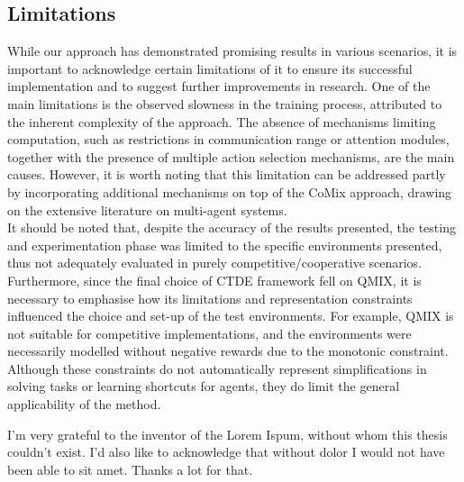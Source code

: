 \documentclass[a4paper,singleside,12pt]{report} %
\begin{document}
\subsection{Limitations}\label{limitations}
While our approach has demonstrated promising results in various scenarios, it is important to acknowledge certain limitations of it to ensure its successful implementation and to suggest further improvements in research. One of the main limitations is the observed slowness in the training process, attributed to the inherent complexity of the approach. The absence of mechanisms limiting computation, such as restrictions in communication range or attention modules, together with the presence of multiple action selection mechanisms, are the main causes. However, it is worth noting that this limitation can be addressed partly by incorporating additional mechanisms on top of the CoMix approach, drawing on the extensive literature on multi-agent systems.\\
It should be noted that, despite the accuracy of the results presented, the testing and experimentation phase was limited to the specific environments presented, thus not adequately evaluated in purely competitive/cooperative scenarios. Furthermore, since the final choice of CTDE framework fell on QMIX, it is necessary to emphasise how its limitations and representation constraints influenced the choice and set-up of the test environments. For example, QMIX is not suitable for competitive implementations, and the environments were necessarily modelled without negative rewards due to the monotonic constraint. Although these constraints do not automatically represent simplifications in solving tasks or learning shortcuts for agents, they do limit the general applicability of the method.

	\appendix
	
	\printbibliography[heading=bibintoc] %
	
	\acknowledgements
	   I'm very grateful to the inventor of the Lorem Ispum, without whom this thesis couldn't exist. I'd also like to acknowledge that without dolor I would not have been able to sit amet. Thanks a lot for that.
		
\end{document}
